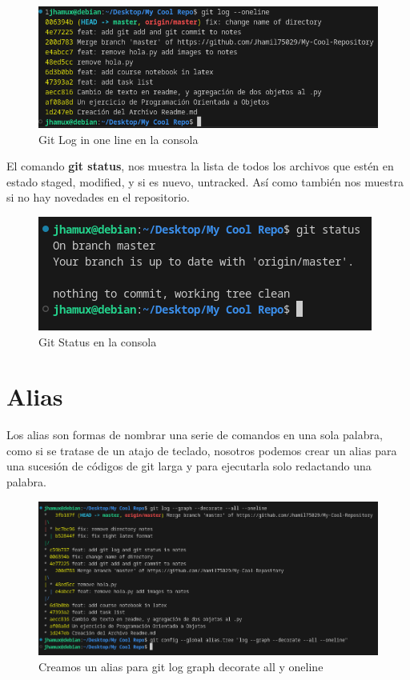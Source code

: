 \documentclass[13pt]{article}
\begin{document}
\begin{figure}[H]
	\centering
	\includegraphics[scale = 0.4]{Images/gitlog2.png}
	\caption {\small Git Log in one line en la consola}
\end{figure}

El comando \textbf{git status}, nos muestra la lista de todos los archivos que estén en estado staged, modified, y si es nuevo, untracked. Así como también nos muestra si no hay novedades en el repositorio.\\

\begin{figure}[H]
	\centering
	\includegraphics[scale = 0.4]{Images/gitstatus.png}
	\caption {\small Git Status en la consola}
\end{figure}

\section{Alias}
Los alias son formas de nombrar una serie de comandos en una sola palabra, como si se tratase de un atajo de teclado, nosotros podemos crear un alias para una sucesión de códigos de git larga y para ejecutarla solo redactando una palabra.\\

\begin{figure}[H]
	\centering
	\includegraphics[scale = 0.4]{Images/alias1.png}
	\caption {\small Creamos un alias para git log graph decorate all y oneline}
\end{figure}
\end{document}
